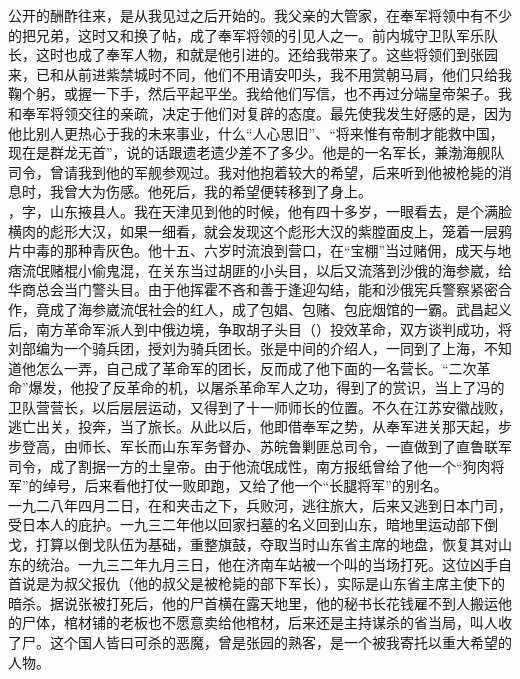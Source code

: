 公开的酬酢往来，是从我见过之后开始的。我父亲的大管家，在奉军将领中有不少的把兄弟，这时又和换了帖，成了奉军将领的引见人之一。前内城守卫队军乐队长，这时也成了奉军人物，和就是他引进的。还给我带来了。这些将领们到张园来，已和从前进紫禁城时不同，他们不用请安叩头，我不用赏朝马肩，他们只给我鞠个躬，或握一下手，然后平起平坐。我给他们写信，也不再过分端皇帝架子。我和奉军将领交往的亲疏，决定于他们对复辟的态度。最先使我发生好感的是，因为他比别人更热心于我的未来事业，什么“人心思旧”、“将来惟有帝制才能救中国，现在是群龙无首”，说的话跟遗老遗少差不了多少。他是的一名军长，兼渤海舰队司令，曾请我到他的军舰参观过。我对他抱着较大的希望，后来听到他被枪毙的消息时，我曾大为伤感。他死后，我的希望便转移到了身上。\\

，字，山东掖县人。我在天津见到他的时候，他有四十多岁，一眼看去，是个满脸横肉的彪形大汉，如果一细看，就会发现这个彪形大汉的紫膛面皮上，笼着一层鸦片中毒的那种青灰色。他十五、六岁时流浪到营口，在“宝棚”当过赌佣，成天与地痞流氓赌棍小偷鬼混，在关东当过胡匪的小头目，以后又流落到沙俄的海参崴，给华商总会当门警头目。由于他挥霍不吝和善于逢迎勾结，能和沙俄宪兵警察紧密合作，竟成了海参崴流氓社会的红人，成了包娼、包赌、包庇烟馆的一霸。武昌起义后，南方革命军派人到中俄边境，争取胡子头目（）投效革命，双方谈判成功，将刘部编为一个骑兵团，授刘为骑兵团长。张是中间的介绍人，一同到了上海，不知道他怎么一弄，自己成了革命军的团长，反而成了他下面的一名营长。“二次革命”爆发，他投了反革命的机，以屠杀革命军人之功，得到了的赏识，当上了冯的卫队营营长，以后层层运动，又得到了十一师师长的位置。不久在江苏安徽战败，逃亡出关，投奔，当了旅长。从此以后，他即借奉军之势，从奉军进关那天起，步步登高，由师长、军长而山东军务督办、苏皖鲁剿匪总司令，一直做到了直鲁联军司令，成了割据一方的土皇帝。由于他流氓成性，南方报纸曾给了他一个“狗肉将军”的绰号，后来看他打仗一败即跑，又给了他一个“长腿将军”的别名。\\

一九二八年四月二日，在和夹击之下，兵败河，逃往旅大，后来又逃到日本门司，受日本人的庇护。一九三二年他以回家扫墓的名义回到山东，暗地里运动部下倒戈，打算以倒戈队伍为基础，重整旗鼓，夺取当时山东省主席的地盘，恢复其对山东的统治。一九三二年九月三日，他在济南车站被一个叫的当场打死。这位凶手自首说是为叔父报仇（他的叔父是被枪毙的部下军长），实际是山东省主席主使下的暗杀。据说张被打死后，他的尸首横在露天地里，他的秘书长花钱雇不到人搬运他的尸体，棺材铺的老板也不愿意卖给他棺材，后来还是主持谋杀的省当局，叫人收了尸。这个国人皆曰可杀的恶魔，曾是张园的熟客，是一个被我寄托以重大希望的人物。\\

